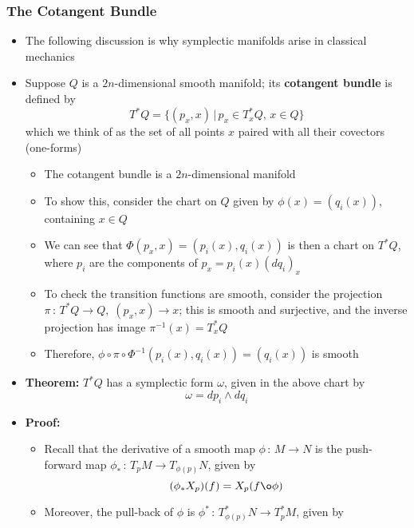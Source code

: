 \documentclass[12pt,a4paper]{article}
\numberwithin{equation}{section}
\begin{document}
	\subsubsection{The Cotangent Bundle}
	\begin{itemize}
		\item The following discussion is why symplectic manifolds arise in classical mechanics
		\item Suppose $Q$ is a $2n$-dimensional smooth manifold; its \textbf{cotangent bundle} is defined by
		\begin{equation}
			T^{*}Q=\{(p_{x},x)\,|\,p_{x}\in T_{x}^{*}Q,\,x\in Q\}
		\end{equation}
		which we think of as the set of all points $x$ paired with all their covectors (one-forms)
		\begin{itemize}
			\item The cotangent bundle is a $2n$-dimensional manifold
			\item To show this, consider the chart on $Q$ given by $\phi(x)=(q_{i}(x))$, containing $x\in Q$
			\item We can see that $\Phi(p_{x},x)=(p_{i}(x),q_{i}(x))$ is then a chart on $T^{*}Q$, where $p_{i}$ are the components of $p_{x}=p_{i}(x)(dq_{i})_{x}$
			\item To check the transition functions are smooth, consider the projection $\pi\,:\,T^{*}Q\to Q,\;(p_{x},x)\to x$; this is smooth and surjective, and the inverse projection has image $\pi^{-1}(x)=T_{x}^{*}Q$
			\item Therefore, $\phi\circ \pi\circ\Phi^{-1}(p_{i}(x),q_{i}(x))=(q_{i}(x))$ is smooth
		\end{itemize}
		\item \textbf{Theorem:} $T^{*}Q$ has a symplectic form $\omega$, given in the above chart by
		\begin{equation}
			\omega=dp_{i}\wedge dq_{i}
		\end{equation}
		\item \textbf{Proof:}
		\begin{itemize}
			\item Recall that the derivative of a smooth map $\phi\,:\,M \to N$ is the push-forward map $\phi_{*}\,:\,T_{p}M\to T_{\phi(p)}N$, given by
			\begin{equation}
				(\phi_{*}X_{p})(f)=X_{p}(f\o\phi)
			\end{equation}
			\item Moreover, the pull-back of $\phi$ is $\phi^{*}\,:\,T_{\phi(p)}^{*}N\to T_{p}^{*}M$, given by

\end{itemize}
\end{itemize}
\end{document}

